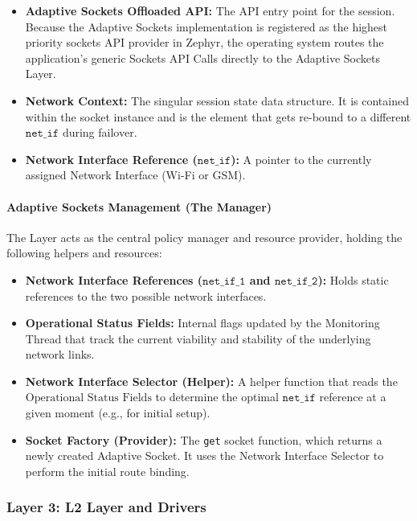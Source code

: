 \begin{itemize}
    \item \textbf{Adaptive Sockets Offloaded API:} The API entry point for the session. Because the Adaptive Sockets implementation is registered as the highest priority sockets API provider in Zephyr, the operating system routes the application's generic Sockets API Calls directly to the Adaptive Sockets Layer.
    \item \textbf{Network Context:} The singular session state data structure. It is contained within the socket instance and is the element that gets re-bound to a different $\texttt{net\_if}$ during failover.
    \item \textbf{Network Interface Reference ($\texttt{net\_if}$):} A pointer to the currently assigned Network Interface (Wi-Fi or GSM).
\end{itemize}

\paragraph{Adaptive Sockets Management (The Manager)}
The Layer acts as the central policy manager and resource provider, holding the following helpers and resources:

\begin{itemize}
    \item \textbf{Network Interface References ($\texttt{net\_if\_1}$ and $\texttt{net\_if\_2}$):} Holds static references to the two possible network interfaces.
    \item \textbf{Operational Status Fields:} Internal flags updated by the Monitoring Thread that track the current viability and stability of the underlying network links.
    \item \textbf{Network Interface Selector (Helper):} A helper function that reads the $\text{Operational Status Fields}$ to determine the optimal $\texttt{net\_if}$ reference at a given moment (e.g., for initial setup).
    \item \textbf{Socket Factory (Provider):} The \texttt{get} socket function, which returns a newly created Adaptive Socket. It uses the Network Interface Selector to perform the initial route binding.
\end{itemize}

\subsubsection{Layer 3: L2 Layer and Drivers}
\label{sssec:l2_drivers}

